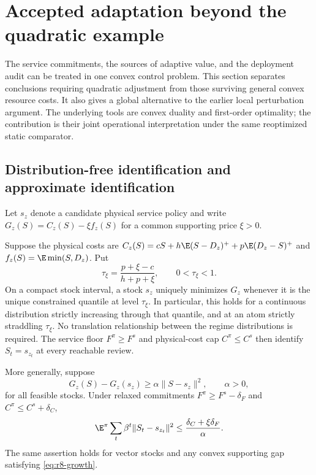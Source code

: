\section{Accepted adaptation beyond the quadratic example}\label{sec:r8-general}
The service commitments, the sources of adaptive value, and the deployment audit can be treated in one convex control problem. This section separates conclusions requiring quadratic adjustment from those surviving general convex resource costs. It also gives a global alternative to the earlier local perturbation argument. The underlying tools are convex duality and first-order optimality; the contribution is their joint operational interpretation under the same reoptimized static comparator.

\subsection{Distribution-free identification and approximate identification}
Let $s_z$ denote a candidate physical service policy and write
$G_z(S)=C_z(S)-\xi f_z(S)$ for a common supporting price $\xi>0$.
\begin{proposition}\label{prop:r8-quantile}
Suppose the physical costs are $C_z(S)=cS+h\E(S-D_z)^++p\E(D_z-S)^+$ and $f_z(S)=\E\min(S,D_z)$. Put
\[
 \tau_\xi=\frac{p+\xi-c}{h+p+\xi},\qquad 0<\tau_\xi<1.
\]
On a compact stock interval, a stock $s_z$ uniquely minimizes $G_z$ whenever it is the unique constrained quantile at level $\tau_\xi$. In particular, this holds for a continuous distribution strictly increasing through that quantile, and at an atom strictly straddling $\tau_\xi$. No translation relationship between the regime distributions is required. The service floor $F^\pi\geq F^s$ and physical-cost cap $C^\pi\leq C^s$ then identify $S_t=s_{z_t}$ at every reachable review.

More generally, suppose
\begin{equation}\label{eq:r8-growth}
 G_z(S)-G_z(s_z)\geq \alpha\|S-s_z\|^2,\qquad \alpha>0,
\end{equation}
for all feasible stocks. Under relaxed commitments $F^\pi\geq F^s-\delta_F$ and $C^\pi\leq C^s+\delta_C$,
\begin{equation}\label{eq:r8-near-pin}
 \E^\pi\sum_t\beta^t\|S_t-s_{z_t}\|^2
 \leq \frac{\delta_C+\xi\delta_F}{\alpha}.
\end{equation}
The same assertion holds for vector stocks and any convex supporting gap satisfying \eqref{eq:r8-growth}.
\end{proposition}

